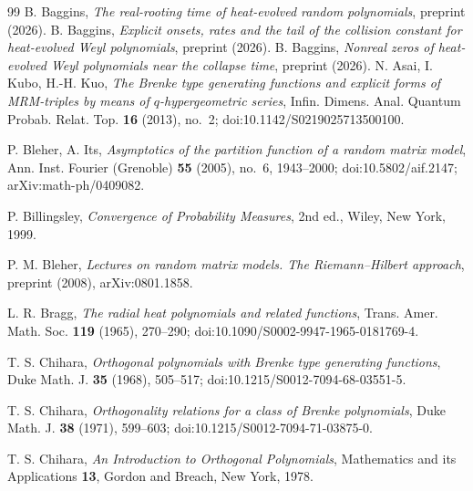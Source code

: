 \documentclass[11pt]{amsart}
\theoremstyle{definition}
\theoremstyle{remark}
\numberwithin{equation}{section}
\begin{document}
\begin{thebibliography}{99}
 B. Baggins, \emph{The real-rooting time of heat-evolved random polynomials}, preprint (2026).
 B. Baggins, \emph{Explicit onsets, rates and the tail of the collision constant for heat-evolved Weyl polynomials}, preprint (2026).
 B. Baggins, \emph{Nonreal zeros of heat-evolved Weyl polynomials near the collapse time}, preprint (2026).
 N. Asai, I. Kubo, H.-H. Kuo, \emph{The Brenke type generating functions and explicit forms of MRM-triples by means of $q$-hypergeometric series}, Infin. Dimens. Anal. Quantum Probab. Relat. Top. \textbf{16} (2013), no.~2; doi:10.1142/S0219025713500100.

 P. Bleher, A. Its, \emph{Asymptotics of the partition function of a random matrix model}, Ann. Inst. Fourier (Grenoble) \textbf{55} (2005), no.~6, 1943--2000; doi:10.5802/aif.2147; arXiv:math-ph/0409082.

 P. Billingsley, \emph{Convergence of Probability Measures}, 2nd ed., Wiley, New York, 1999.

 P. M. Bleher, \emph{Lectures on random matrix models. The Riemann--Hilbert approach}, preprint (2008), arXiv:0801.1858.

 L. R. Bragg, \emph{The radial heat polynomials and related functions}, Trans. Amer. Math. Soc. \textbf{119} (1965), 270--290; doi:10.1090/S0002-9947-1965-0181769-4.

 T. S. Chihara, \emph{Orthogonal polynomials with Brenke type generating functions}, Duke Math. J. \textbf{35} (1968), 505--517; doi:10.1215/S0012-7094-68-03551-5.

 T. S. Chihara, \emph{Orthogonality relations for a class of Brenke polynomials}, Duke Math. J. \textbf{38} (1971), 599--603; doi:10.1215/S0012-7094-71-03875-0.

 T. S. Chihara, \emph{An Introduction to Orthogonal Polynomials}, Mathematics and its Applications \textbf{13}, Gordon and Breach, New York, 1978.


\end{thebibliography}
\end{document}
